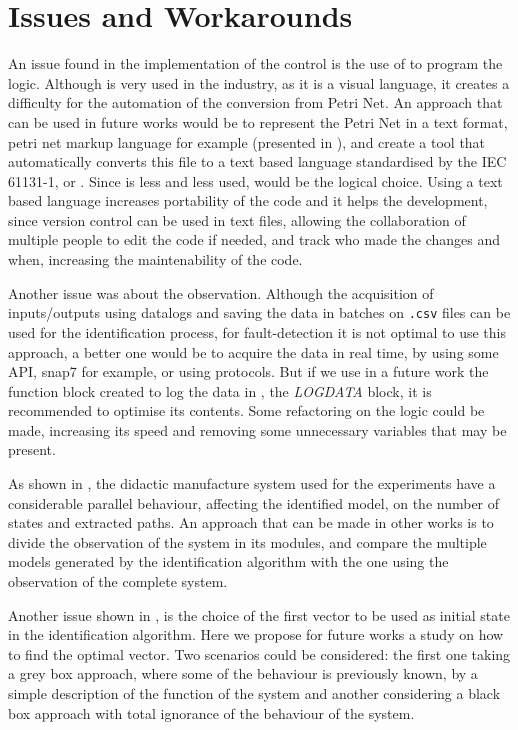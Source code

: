 \section{Issues and Workarounds}
An issue found in the implementation of the control is the use of \LD{} to
program the logic. Although \LD{} is very used
in the industry, as it is a visual language, it creates a difficulty for the
automation of the conversion from Petri Net. An approach that can be used in
future works would be to represent the Petri Net in a text format, petri net
markup language for example (presented in \cite{weber2003petri}), and create a
tool that automatically converts this file to a text based language standardised
by the IEC 61131-1, \IL{} or \ST{}. Since \IL{} is less and less used, \ST{}
would be the logical choice. Using a text based language increases portability
of the code and it helps the development, since version control can be used in
text files, allowing the collaboration of multiple people to edit the code if
needed, and track who made the changes and when, increasing the maintenability
of the code.



Another issue was about the observation. Although the acquisition of
inputs\slash outputs using datalogs and saving the data in batches on
\verb|.csv| files can be used for the identification process, for
fault-detection it is not optimal to use this approach, a better one would be to
acquire the data in real time, by using some API, snap7 for example, or using
\SCADA{} protocols. But if we use in a future work the function block created to log
the data in , the \emph{LOGDATA} block, it is recommended to
optimise its contents. Some refactoring on the logic could be made, increasing its
speed and removing some unnecessary variables that may be present.

As shown in , the didactic manufacture system used for the
experiments have a considerable parallel behaviour, affecting the identified
model, on the number of states and extracted paths. An approach that can be made
in other works is to divide the observation of the system in its modules, and
compare the multiple models generated by the identification algorithm with the
one using the observation of the complete system.

Another issue shown in , is the choice of the first
vector to be used as initial state in the identification algorithm. Here we
propose for future works a study on how to find the optimal vector. Two
scenarios could be considered: the first one taking a grey box approach, where some of the behaviour
is previously known, by a simple description of the function of the system and another considering a black box approach with total ignorance
of the behaviour of the system.

